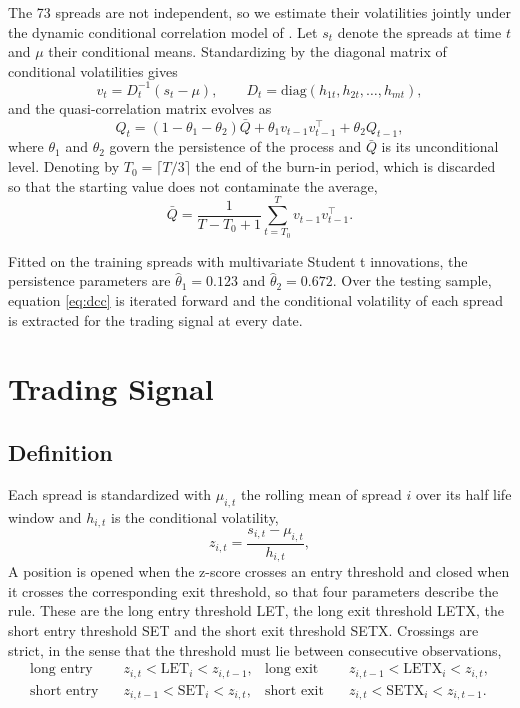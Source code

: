 \documentclass[11pt]{article}
\begin{document}
The 73 spreads are not independent, so we estimate their volatilities jointly under the dynamic conditional correlation model of \citet{engle2002}. Let $s_t$ denote the spreads at time $t$ and $\mu$ their conditional means. Standardizing by the diagonal matrix of conditional volatilities gives
\begin{equation}
v_t = D_t^{-1}(s_t - \mu), \qquad D_t = \mathrm{diag}(h_{1t}, h_{2t}, \ldots, h_{mt}),
\end{equation}
and the quasi-correlation matrix evolves as
\begin{equation}
Q_t = (1 - \theta_1 - \theta_2)\bar{Q} + \theta_1 v_{t-1} v_{t-1}^\top + \theta_2 Q_{t-1},
\label{eq:dcc}
\end{equation}
where $\theta_1$ and $\theta_2$ govern the persistence of the process and $\bar{Q}$ is its unconditional level. Denoting by $T_0 = \lceil T/3 \rceil$ the end of the burn-in period, which is discarded so that the starting value does not contaminate the average,
\begin{equation}
\bar{Q} = \frac{1}{T - T_0 + 1} \sum_{t = T_0}^{T} v_{t-1} v_{t-1}^\top .
\end{equation}

Fitted on the training spreads with multivariate Student t innovations, the persistence parameters are $\hat{\theta}_1 = 0.123$ and $\hat{\theta}_2 = 0.672$. Over the testing sample, equation \eqref{eq:dcc} is iterated forward and the conditional volatility of each spread is extracted for the trading signal at every date.

\section{Trading Signal}

\subsection{Definition}

Each spread is standardized with $\mu_{i,t}$ the rolling mean of spread $i$ over its half life window and $h_{i,t}$ is the conditional volatility,
\begin{equation}
z_{i,t} = \frac{s_{i,t} - \mu_{i,t}}{h_{i,t}},
\end{equation}
A position is opened when the z-score crosses an entry threshold and closed when it crosses the corresponding exit threshold, so that four parameters describe the rule. These are the long entry threshold LET, the long exit threshold LETX, the short entry threshold SET and the short exit threshold SETX. Crossings are strict, in the sense that the threshold must lie between consecutive observations,
\begin{align*}
\text{long entry} \quad & z_{i,t} < \text{LET}_i < z_{i,t-1}, &
\text{long exit} \quad & z_{i,t-1} < \text{LETX}_i < z_{i,t}, \\
\text{short entry} \quad & z_{i,t-1} < \text{SET}_i < z_{i,t}, &
\text{short exit} \quad & z_{i,t} < \text{SETX}_i < z_{i,t-1}.
\end{align*}
\end{document}
